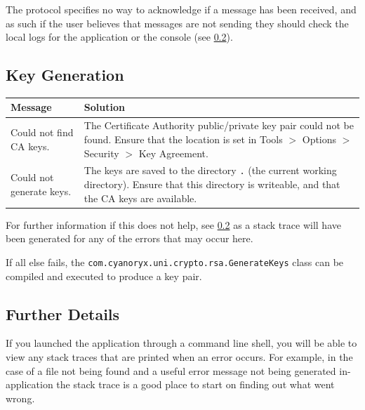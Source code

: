 The protocol specifies no way to acknowledge if a message has been received, and as such if the user believes that messages are not sending they should check the local logs for the application or the console (see \textsection\ref{subsec:man_further_details}).

\subsection{Key Generation}

\begin{center}
  \begin{tabular}{|l|p{5.0cm}|}
    \hline
    \textbf{Message} & \textbf{Solution} \\ \hline \hline
    Could not find CA keys. & The Certificate Authority public/private key pair could not be found. Ensure that the location is set in Tools $>$ Options $>$ Security $>$ Key Agreement. \\ \hline
    Could not generate keys. & The keys are saved to the directory \verb!.! (the current working directory). Ensure that this directory is writeable, and that the CA keys are available. \\
    \hline
  \end{tabular}
\end{center}

For further information if this does not help, see \textsection\ref{subsec:man_further_details} as a stack trace will have been generated for any of the errors that may occur here.

If all else fails, the \verb!com.cyanoryx.uni.crypto.rsa.GenerateKeys! class can be compiled and executed to produce a key pair.

\subsection{Further Details}
\label{subsec:man_further_details}

If you launched the application through a command line shell, you will be able to view any stack traces that are printed when an error occurs. For example, in the case of a file not being found and a useful error message not being generated in-application the stack trace is a good place to start on finding out what went wrong.